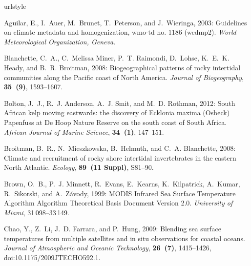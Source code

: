 \documentclass[]{ametsoc}
\begin{document}
\begin{thebibliography}{41}
\providecommand{\natexlab}[1]{#1}
\providecommand{\url}[1]{\texttt{#1}}
\renewcommand{\UrlFont}{\rmfamily}
\providecommand{\urlprefix}{URL }
\expandafter\ifx\csname urlstyle\endcsname\relax
  \providecommand{\doi}[1]{doi:\discretionary{}{}{}#1}\else
  \providecommand{\doi}{doi:\discretionary{}{}{}\begingroup
  \urlstyle{rm}\Url}\fi
\providecommand{\eprint}[2][]{\url{#2}}

Aguilar, E., I.~Auer, M.~Brunet, T.~Peterson, and J.~Wieringa, 2003: Guidelines
  on climate metadata and homogenization, wmo-td no. 1186 (wcdmp2).
  \textit{World Meteorological Organization, Geneva}.

Blanchette, C.~A., C.~{Melissa Miner}, P.~T. Raimondi, D.~Lohse, K.~E.~K.
  Heady, and B.~R. Broitman, 2008: {Biogeographical patterns of rocky
  intertidal communities along the Pacific coast of North America}.
  \textit{Journal of Biogeography}, \textbf{35~(9)}, 1593--1607.

Bolton, J.~J., R.~J. Anderson, A.~J. Smit, and M.~D. Rothman, 2012: {South
  African kelp moving eastwards: the discovery of Ecklonia maxima (Osbeck)
  Papenfuss at De Hoop Nature Reserve on the south coast of South Africa}.
  \textit{African Journal of Marine Science}, \textbf{34~(1)}, 147--151.

Broitman, B.~R., N.~Mieszkowska, B.~Helmuth, and C.~A. Blanchette, 2008:
  {Climate and recruitment of rocky shore intertidal invertebrates in the
  eastern North Atlantic.} \textit{Ecology}, \textbf{89~(11 Suppl)}, S81--90.

Brown, O.~B., P.~J. Minnett, R.~Evans, E.~Kearns, K.~Kilpatrick, A.~Kumar,
  R.~Sikorski, and A.~Z{\'{a}}vody, 1999: {MODIS Infrared Sea Surface
  Temperature Algorithm Algorithm Theoretical Basis Document Version 2.0}.
  \textit{University of Miami}, 31\,098--33\,149.

Chao, Y., Z.~Li, J.~D. Farrara, and P.~Hung, 2009: {Blending sea surface
  temperatures from multiple satellites and in situ observations for coastal
  oceans}. \textit{Journal of Atmospheric and Oceanic Technology},
  \textbf{26~(7)}, 1415--1426, \doi{10.1175/2009JTECHO592.1}.


\end{thebibliography}
\end{document}
